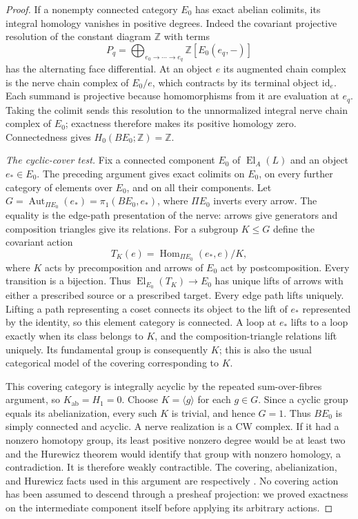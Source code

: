 \documentclass[11pt,a4paper]{article}
\theoremstyle{definition}
\theoremstyle{remark}
\newcommand{\Z}{\mathbb Z}
\newcommand{\id}{\mathrm{id}}
\newcommand{\El}{\operatorname{El}}
\begin{document}
\begin{proof}
If a nonempty connected category $E_0$ has exact abelian
colimits, its integral homology vanishes in positive degrees.
Indeed the covariant projective resolution of the constant
diagram $\Z$ with terms
\[
 P_q=\bigoplus_{e_0\to\cdots\to e_q}
                  \Z[E_0(e_q,-)]
\]
has the alternating face differential.  At an object $e$ its
augmented chain complex is the nerve chain complex of $E_0/e$,
which contracts by its terminal object $\id_e$.  Each summand
is projective because homomorphisms from it are evaluation at
$e_q$.  Taking the colimit sends this resolution to the
unnormalized integral nerve chain complex of $E_0$; exactness
therefore makes its positive homology zero.  Connectedness
gives $H_0(BE_0;\Z)=\Z$.

\emph{The cyclic-cover test.}
Fix a connected component $E_0$ of $\El_A(L)$ and an object
$e_*\in E_0$.  The preceding argument gives exact colimits on
$E_0$, on every further category of elements over $E_0$, and on
all their components.  Let
$G=\operatorname{Aut}_{\Pi E_0}(e_*)=\pi_1(BE_0,e_*)$, where
$\Pi E_0$ inverts every arrow.  The equality is the edge-path
presentation of the nerve: arrows give generators and
composition triangles give its relations.  For a subgroup
$K\leq G$ define the covariant action
\[
 T_K(e)=\operatorname{Hom}_{\Pi E_0}(e_*,e)/K,
\]
where $K$ acts by precomposition and arrows of $E_0$ act by
postcomposition.  Every transition is a bijection.  Thus
$\El_{E_0}(T_K)\to E_0$ has unique lifts of arrows with either
a prescribed source or a prescribed target.  Every edge path
lifts uniquely.  Lifting a path representing a coset connects
its object to the lift of $e_*$ represented by the identity,
so this element category is connected.  A loop at $e_*$ lifts
to a loop exactly when its class belongs to $K$, and the
composition-triangle relations lift uniquely.  Its fundamental
group is consequently $K$; this is also the usual categorical
model of the covering corresponding to $K$.

This covering category is integrally acyclic by the repeated
sum-over-fibres argument, so $K_{\mathrm{ab}}=H_1=0$.
Choose $K=\langle g\rangle$ for each $g\in G$.  Since a cyclic
group equals its abelianization, every such $K$ is trivial,
and hence $G=1$.  Thus $BE_0$ is simply connected and acyclic.
A nerve realization is a CW complex.  If it had a nonzero
homotopy group, its least positive nonzero degree would be at
least two and the Hurewicz theorem would identify that group
with nonzero homology, a contradiction.  It is therefore
weakly contractible.  The covering, abelianization, and
Hurewicz facts used in this argument are respectively
\citet[Theorems 1.38, 2A.1, and 4.32]{Hatcher2002}.
No covering action has been assumed to descend through a
presheaf projection: we proved exactness on the intermediate
component itself before applying its arbitrary actions.


\end{proof}
\end{document}
